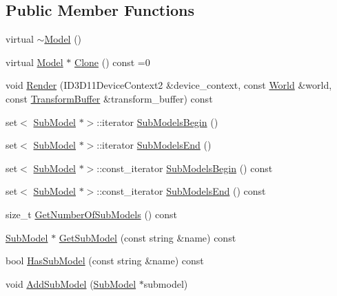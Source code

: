 \subsection*{Public Member Functions}
\begin{DoxyCompactItemize}
\item 
virtual \hyperlink{classmage_1_1_model_afc6e31cb05ca98c456db56a3e03743d7}{$\sim$\+Model} ()
\item 
virtual \hyperlink{classmage_1_1_model}{Model} $\ast$ \hyperlink{classmage_1_1_model_ae5e9bee52da0db8c7a29920c13ed40ea}{Clone} () const =0
\item 
void \hyperlink{classmage_1_1_model_ac377c873448cb5fd55b5c02b77452760}{Render} (I\+D3\+D11\+Device\+Context2 \&device\+\_\+context, const \hyperlink{classmage_1_1_world}{World} \&world, const \hyperlink{structmage_1_1_transform_buffer}{Transform\+Buffer} \&transform\+\_\+buffer) const
\item 
set$<$ \hyperlink{classmage_1_1_sub_model}{Sub\+Model} $\ast$$>$\+::iterator \hyperlink{classmage_1_1_model_a8845f0db130f224f41132996a206c354}{Sub\+Models\+Begin} ()
\item 
set$<$ \hyperlink{classmage_1_1_sub_model}{Sub\+Model} $\ast$$>$\+::iterator \hyperlink{classmage_1_1_model_a44e7b26f9852046aa96dc41c01222a04}{Sub\+Models\+End} ()
\item 
set$<$ \hyperlink{classmage_1_1_sub_model}{Sub\+Model} $\ast$$>$\+::const\+\_\+iterator \hyperlink{classmage_1_1_model_a043f7ac7bbaa1bd60bec3bc517428775}{Sub\+Models\+Begin} () const
\item 
set$<$ \hyperlink{classmage_1_1_sub_model}{Sub\+Model} $\ast$$>$\+::const\+\_\+iterator \hyperlink{classmage_1_1_model_a855e215577321ff6e226c624d7bd7e39}{Sub\+Models\+End} () const
\item 
size\+\_\+t \hyperlink{classmage_1_1_model_a29ad2496b11ef5af5f179cfe52943cd3}{Get\+Number\+Of\+Sub\+Models} () const
\item 
\hyperlink{classmage_1_1_sub_model}{Sub\+Model} $\ast$ \hyperlink{classmage_1_1_model_a1cae9eb62a353445d14b5331e88bdeac}{Get\+Sub\+Model} (const string \&name) const
\item 
bool \hyperlink{classmage_1_1_model_a319fb9b9d9c673ed9c83325d5bcbdfd7}{Has\+Sub\+Model} (const string \&name) const
\item 
void \hyperlink{classmage_1_1_model_abf3f207329b5d4482e515e206e856295}{Add\+Sub\+Model} (\hyperlink{classmage_1_1_sub_model}{Sub\+Model} $\ast$submodel)
\end{DoxyCompactItemize}
